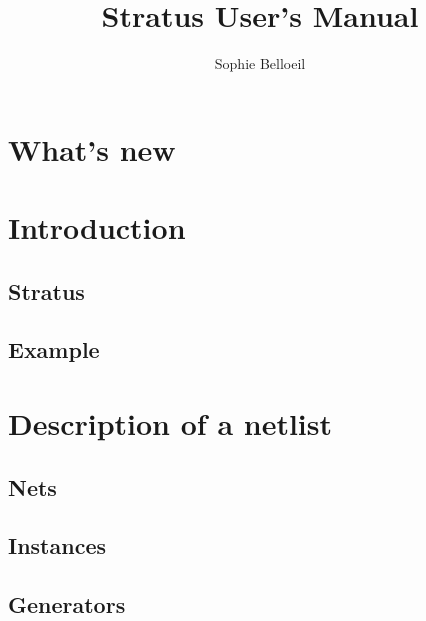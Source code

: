 \documentclass[12pt]{article}
\date   {}
\title  {Stratus User's Manual}
\author {Sophie Belloeil}
\begin{document}
\setlength{\footrulewidth}{0.6pt}
\maketitle


\tableofchildlinks
\htmlrule

\section{What's new}


\section{Introduction}
\label{secintroduction}
    
    \subsection{Stratus}
    \label{secstratus}
    
    \subsection{Example}
    \label{secexample}
    
   
\section{Description of a netlist}
\label{secnetlist}
    
    \subsection{Nets}
    \label{secnet}
    
    \subsection{Instances}
    \label{secinst}
    
    \subsection{Generators}
    \label{secgen}
    
    
\end{document}
